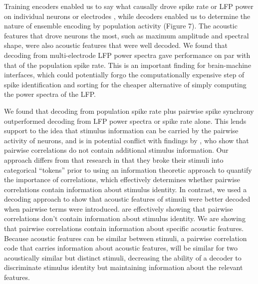     Training encoders enabled us to say what causally drove spike rate or LFP power on individual neurons or electrodes \cite{Weichwald2015}, while decoders enabled us to determine the nature of ensemble encoding by population activity (Figure 7). The acoustic features that drove neurons the most, such as maximum amplitude and spectral shape, were also acoustic features that were well decoded. We found that decoding from multi-electrode LFP power spectra gave performance on par with that of the population spike rate. This is an important finding for brain-machine interfaces, which could potentially forgo the computationally expensive step of spike identification and sorting for the cheaper alternative of simply computing the power spectra of the LFP.

    We found that decoding from population spike rate plus pairwise spike synchrony outperformed decoding from LFP power spectra or spike rate alone. This lends support to the idea that stimulus information can be carried by the pairwise activity of neurons, and is in potential conflict with findings by \cite{Ince2013}, who show that pairwise correlations do not contain additional stimulus information. Our approach differs from that research in that they broke their stimuli into categorical “tokens” prior to using an information theoretic approach to quantify the importance of correlations, which effectively determines whether pairwise correlations contain information about stimulus identity. In contrast, we used a decoding approach to show that acoustic features of stimuli were better decoded when pairwise terms were introduced. \cite{Ince2013} are effectively showing that pairwise correlations don’t contain information about stimulus identity. We are showing that pairwise correlations contain information about specific acoustic features. Because acoustic features can be similar between stimuli, a pairwise correlation code that carries information about acoustic features, will be similar for two acoustically similar but distinct stimuli, decreasing the ability of a decoder to discriminate stimulus identity but maintaining information about the relevant features.


